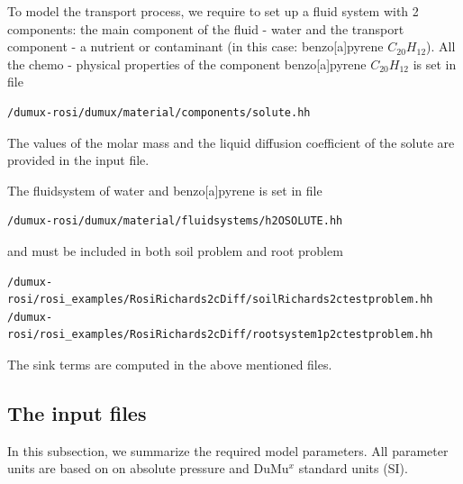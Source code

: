 To model the transport process, we require to set up a fluid system with 2 components: the main component of the fluid - water and the transport component - a nutrient or contaminant (in this case: benzo{[}a{]}pyrene $C_{20}H_{12}$). All the chemo - physical properties of the component benzo{[}a{]}pyrene $C_{20}H_{12}$ is set in file

\begin{lstlisting}
/dumux-rosi/dumux/material/components/solute.hh
\end{lstlisting}


The values of the molar mass and the liquid diffusion coefficient of the solute are provided in the input file. 

The fluidsystem of water and benzo{[}a{]}pyrene is set in file

\begin{lstlisting}
/dumux-rosi/dumux/material/fluidsystems/h2OSOLUTE.hh
\end{lstlisting}

and must be included in both soil problem and root problem

\begin{lstlisting}
/dumux-rosi/rosi_examples/RosiRichards2cDiff/soilRichards2ctestproblem.hh
/dumux-rosi/rosi_examples/RosiRichards2cDiff/rootsystem1p2ctestproblem.hh
\end{lstlisting}


The sink terms are computed in the above mentioned files.





\subsection*{The input files}

In this subsection, we summarize the required model parameters. All parameter units are based on on absolute pressure and DuMu$^{x}$ standard units (SI).

